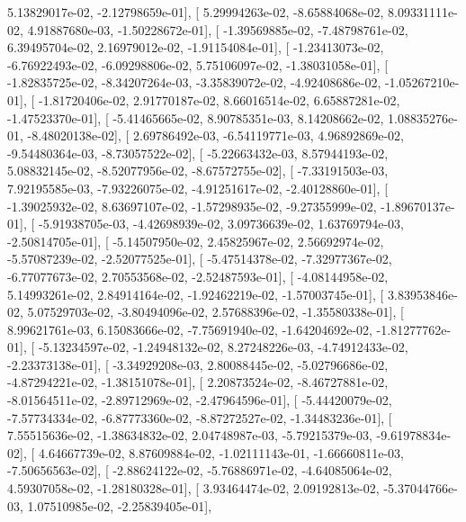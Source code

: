 \documentclass{article}
\begin{document}
          5.13829017e-02,  -2.12798659e-01],
       [  5.29994263e-02,  -8.65884068e-02,   8.09331111e-02,
          4.91887680e-03,  -1.50228672e-01],
       [ -1.39569885e-02,  -7.48798761e-02,   6.39495704e-02,
          2.16979012e-02,  -1.91154084e-01],
       [ -1.23413073e-02,  -6.76922493e-02,  -6.09298806e-02,
          5.75106097e-02,  -1.38031058e-01],
       [ -1.82835725e-02,  -8.34207264e-03,  -3.35839072e-02,
         -4.92408686e-02,  -1.05267210e-01],
       [ -1.81720406e-02,   2.91770187e-02,   8.66016514e-02,
          6.65887281e-02,  -1.47523370e-01],
       [ -5.41465665e-02,   8.90785351e-03,   8.14208662e-02,
          1.08835276e-01,  -8.48020138e-02],
       [  2.69786492e-03,  -6.54119771e-03,   4.96892869e-02,
         -9.54480364e-03,  -8.73057522e-02],
       [ -5.22663432e-03,   8.57944193e-02,   5.08832145e-02,
         -8.52077956e-02,  -8.67572755e-02],
       [ -7.33191503e-03,   7.92195585e-03,  -7.93226075e-02,
         -4.91251617e-02,  -2.40128860e-01],
       [ -1.39025932e-02,   8.63697107e-02,  -1.57298935e-02,
         -9.27355999e-02,  -1.89670137e-01],
       [ -5.91938705e-03,  -4.42698939e-02,   3.09736639e-02,
          1.63769794e-03,  -2.50814705e-01],
       [ -5.14507950e-02,   2.45825967e-02,   2.56692974e-02,
         -5.57087239e-02,  -2.52077525e-01],
       [ -5.47514378e-02,  -7.32977367e-02,  -6.77077673e-02,
          2.70553568e-02,  -2.52487593e-01],
       [ -4.08144958e-02,   5.14993261e-02,   2.84914164e-02,
         -1.92462219e-02,  -1.57003745e-01],
       [  3.83953846e-02,   5.07529703e-02,  -3.80494096e-02,
          2.57688396e-02,  -1.35580338e-01],
       [  8.99621761e-03,   6.15083666e-02,  -7.75691940e-02,
         -1.64204692e-02,  -1.81277762e-01],
       [ -5.13234597e-02,  -1.24948132e-02,   8.27248226e-03,
         -4.74912433e-02,  -2.23373138e-01],
       [ -3.34929208e-03,   2.80088445e-02,  -5.02796686e-02,
         -4.87294221e-02,  -1.38151078e-01],
       [  2.20873524e-02,  -8.46727881e-02,  -8.01564511e-02,
         -2.89712969e-02,  -2.47964596e-01],
       [ -5.44420079e-02,  -7.57734334e-02,  -6.87773360e-02,
         -8.87272527e-02,  -1.34483236e-01],
       [  7.55515636e-02,  -1.38634832e-02,   2.04748987e-03,
         -5.79215379e-03,  -9.61978834e-02],
       [  4.64667739e-02,   8.87609884e-02,  -1.02111143e-01,
         -1.66660811e-03,  -7.50656563e-02],
       [ -2.88624122e-02,  -5.76886971e-02,  -4.64085064e-02,
          4.59307058e-02,  -1.28180328e-01],
       [  3.93464474e-02,   2.09192813e-02,  -5.37044766e-03,
          1.07510985e-02,  -2.25839405e-01],
\end{document}
